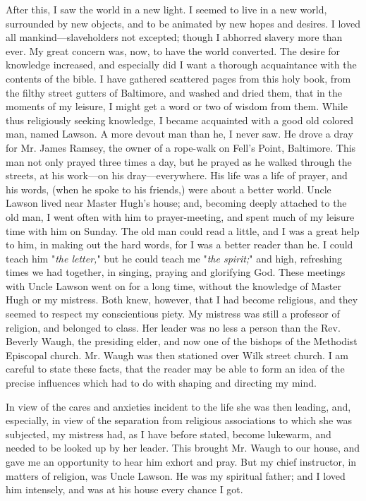 After this, I saw the world in a new light. I
{\protect\hypertarget{167}{}{}}seemed to live in a new world, surrounded
by new objects, and to be animated by new hopes and desires. I loved all
mankind---slaveholders not excepted; though I abhorred slavery more than
ever. My great concern was, now, to have the world converted. The desire
for knowledge increased, and especially did I want a thorough
acquaintance with the contents of the bible. I have gathered scattered
pages from this holy book, from the filthy street gutters of Baltimore,
and washed and dried them, that in the moments of my leisure, I might
get a word or two of wisdom from them. While thus religiously seeking
knowledge, I became acquainted with a good old colored man, named
Lawson. A more devout man than he, I never saw. He drove a dray for Mr.
James Ramsey, the owner of a rope-walk on Fell's Point, Baltimore. This
man not only prayed three times a day, but he prayed as he walked
through the streets, at his work---on his dray---everywhere. His life
was a life of prayer, and his words, (when he spoke to his friends,)
were about a better world. Uncle Lawson lived near Master Hugh's house;
and, becoming deeply attached to the old man, I went often with him to
prayer-meeting, and spent much of my leisure time with him on Sunday.
The old man could read a little, and I was a great help to him, in
making out the hard words, for I was a better reader than he. I could
teach him "\emph{the letter,}" but he could teach me "\emph{the
spirit;}" and high, refreshing times we had together, in singing,
praying and glorifying God. These meetings with Uncle Lawson went on for
a long time, without the knowledge of Master Hugh or
{\protect\hypertarget{168}{}{}}my mistress. Both knew, however, that I
had become religious, and they seemed to respect my conscientious piety.
My mistress was still a professor of religion, and belonged to class.
Her leader was no less a person than the Rev. Beverly Waugh, the
presiding elder, and now one of the bishops of the Methodist Episcopal
church. Mr. Waugh was then stationed over Wilk street church. I am
careful to state these facts, that the reader may be able to form an
idea of the precise influences which had to do with shaping and
directing my mind.

In view of the cares and anxieties incident to the life she was then
leading, and, especially, in view of the separation from religious
associations to which she was subjected, my mistress had, as I have
before stated, become lukewarm, and needed to be looked up by her
leader. This brought Mr. Waugh to our house, and gave me an opportunity
to hear him exhort and pray. But my chief instructor, in matters of
religion, was Uncle Lawson. He was my spiritual father; and I loved him
intensely, and was at his house every chance I got.

